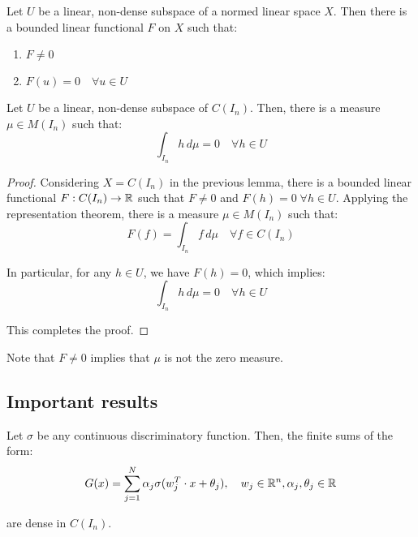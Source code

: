 \begin{lemma}
    Let $U$ be a linear, non-dense subspace of a normed linear space $X$. Then there
    is a bounded linear functional $F$ on $X$ such that:
    \begin{enumerate}[label=(\roman*)]
        \item $F \neq 0$
        \item $F(u) = 0 \quad \forall u \in U$
    \end{enumerate}
\end{lemma}

\begin{lemma}
    Let $U$ be a linear, non-dense subspace of $C(I_n)$. Then, there is a measure 
    $\mu \in M(I_n)$ such that:
    $$\int_{I_n} h \, d\mu = 0 \quad \forall h \in U$$
\end{lemma}

\begin{proof}
    Considering $X = C(I_n)$ in the previous lemma, there is a bounded linear functional
    $F: C(I_n) \to \mathbb{R}$ such that $F \neq 0$ and $F(h) = 0 \; \forall h \in U$. Applying
    the representation theorem, there is a measure $\mu \in M(I_n)$ such that:
    $$F(f) = \int_{I_n} f \, d\mu \quad \forall f \in C(I_n)$$

    In particular, for any $h \in U$, we have $F(h) = 0$, which implies:
    $$\int_{I_n} h \, d\mu = 0 \quad \forall h \in U$$

    This completes the proof.
\end{proof}

\begin{remark}
    Note that $F \neq 0$ implies that $\mu$ is not the zero measure.
\end{remark}

\subsection{Important results}

\begin{proposition}
    Let $\sigma$ be any continuous discriminatory function. Then, the finite sums of 
    the form:
    $$G(x) = \sum_{j=1}^{N} \alpha_j \sigma(w_j^T \cdot x + \theta_j), \quad w_j \in \mathbb{R}^n, \alpha_j, \theta_j \in \mathbb{R}$$

    are dense in $C(I_n)$.
\end{proposition}

